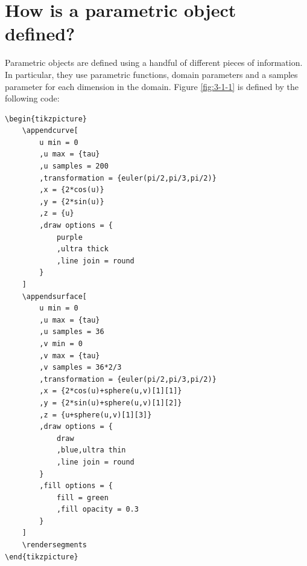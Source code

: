 \documentclass[12pt]{report}
\begin{document}
        \section{How is a parametric object defined?}
            Parametric objects are defined using a handful of 
            different pieces of information. In particular, they 
            use parametric functions, domain parameters and a samples
            parameter for each dimension in the domain. Figure 
            \ref{fig:3-1-1} is defined by the following code:
\begin{verbatim}
\begin{tikzpicture}
    \appendcurve[
        u min = 0
        ,u max = {tau}
        ,u samples = 200
        ,transformation = {euler(pi/2,pi/3,pi/2)}
        ,x = {2*cos(u)}
        ,y = {2*sin(u)}
        ,z = {u}
        ,draw options = {
            purple
            ,ultra thick
            ,line join = round
        }
    ]
    \appendsurface[
        u min = 0
        ,u max = {tau}
        ,u samples = 36
        ,v min = 0
        ,v max = {tau}
        ,v samples = 36*2/3
        ,transformation = {euler(pi/2,pi/3,pi/2)}
        ,x = {2*cos(u)+sphere(u,v)[1][1]}
        ,y = {2*sin(u)+sphere(u,v)[1][2]}
        ,z = {u+sphere(u,v)[1][3]}
        ,draw options = {
            draw
            ,blue,ultra thin
            ,line join = round
        }
        ,fill options = {
            fill = green
            ,fill opacity = 0.3
        }
    ]
    \rendersegments
\end{tikzpicture}
\end{verbatim}
\end{document}
